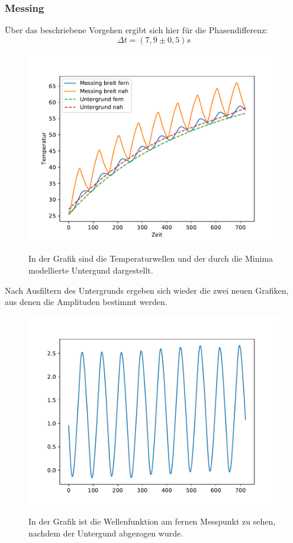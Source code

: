 \documentclass[titlepage = firstcover]{scrartcl}
\begin{document}
  \FloatBarrier

  \newpage



    \subsubsection{Messing}
    Über das beschriebene Vorgehen ergibt sich hier für die Phasendifferenz:
    \begin{equation*}
      \Delta t = (7,9 \pm 0,5) s
    \end{equation*}
    \begin{figure}[h]
      \centering
      \caption{In der Grafik sind die Temperaturwellen und der durch die Minima modellierte Untergund dargestellt.}
      \includegraphics{dynamischmessingbreit.pdf}
      \label{fig:dynamischmes}
    \end{figure}

  Nach Ausfiltern des Untergrunds ergeben sich wieder die zwei neuen Grafiken, aus denen die Amplituden bestimmt werden. 

    \begin{figure}[h]
      \centering
      \caption{In der Grafik ist die Wellenfunktion am fernen Messpunkt zu sehen, nachdem der Untergund abgezogen wurde.}
      \includegraphics{AmpMesbreitFern.pdf}
      \label{fig:AmpMesFern}
    \end{figure}
\end{document}
